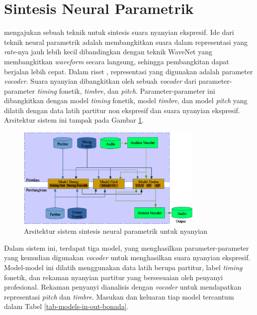 \section{Sintesis Neural Parametrik} \label{literature-neural-parametric}

\citet{bonada2017singing} mengajukan sebuah teknik untuk sintesis suara nyanyian ekspresif. Ide dari teknik neural parametrik \parencite{bonada2017singing} adalah membangkitkan suara dalam representasi yang \textit{rate}-nya jauh lebih kecil dibandingkan dengan teknik WaveNet\parencite{Oord2016WaveNetAG} yang membangkitkan \textit{waveform} secara langsung, sehingga pembangkitan dapat berjalan lebih cepat. Dalam riset \citet{bonada2017singing}, representasi yang digunakan adalah parameter \textit{vocoder}. Suara nyanyian dibangkitkan oleh sebuah \textit{vocoder} dari parameter-parameter \textit{timing} fonetik, \textit{timbre}, dan \textit{pitch}. Parameter-parameter ini dibangkitkan dengan model \textit{timing} fonetik, model \textit{timbre}, dan model \textit{pitch} yang dilatih dengan data latih partitur non ekspresif dan suara nyanyian ekspresif. Arsitektur sistem ini tampak pada Gambar \ref{fig-system-overview-bonada}.

\begin{figure}[h]
    \centering
    \includegraphics[width=0.8\textwidth]{resources/system-overview-bonada.eps}
    \caption{Arsitektur sistem sintesis neural parametrik untuk nyanyian \parencite{bonada2017singing}}\label{fig-system-overview-bonada}
\end{figure}

Dalam sistem ini, terdapat tiga model, yang menghasilkan parameter-parameter yang kemudian digunakan \textit{vocoder} untuk menghasilkan suara nyanyian ekspresif. Model-model ini dilatih menggunakan data latih berupa partitur, label \textit{timing} fonetik, dan rekaman nyanyian partitur yang bersesuaian oleh penyanyi profesional. Rekaman penyanyi dianalisis dengan \textit{vocoder} untuk mendapatkan representasi \textit{pitch} dan \textit{timbre}. Masukan dan keluaran tiap model tercantum dalam Tabel \ref{tab-models-in-out-bonada}. \parencite{bonada2017singing}

